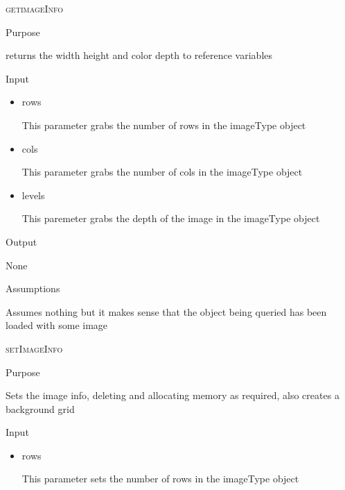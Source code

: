 \documentclass[pdftex, 11pt]{article}
\begin{document}
\begin{description}
\begin{description}
		\end{description}


	\item{\textsc{getimageInfo}}
		\begin{description}
			\item{Purpose}
			
 				returns the width height and color depth 
				to reference variables

			\item{Input}

				\begin{itemize}
					\item{rows}

						This parameter grabs the number of rows
						in the imageType object

					\item{cols}

						This parameter grabs the number of cols
						in the imageType object

					\item{levels}

						This paremeter grabs the depth of the
						image in the imageType object

				\end{itemize}

			\item{Output}

				None

			\item{Assumptions}

				Assumes nothing but it makes sense that the object being
				queried has been loaded with some image



		\end{description}


	\item{\textsc{setImageInfo}}
		\begin{description}
			\item{Purpose}
			
				Sets the image info, deleting and allocating memory
				as required, also creates a background grid

			\item{Input}

				\begin{itemize}
					\item{rows}

						This parameter sets the number of rows
						in the imageType object


\end{itemize}
\end{description}
\end{description}
\end{document}

